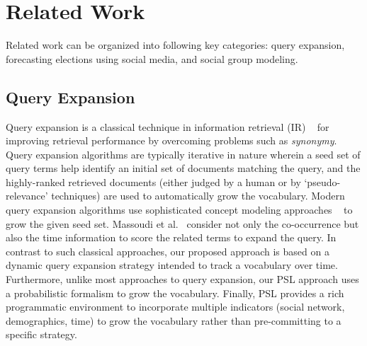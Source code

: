 \section{Related Work}
Related work can be organized into following key categories: query expansion, forecasting elections using social media,
and social group modeling.
\begin{comment}
\reviews{refer\\
Dongsheng Duan, Yuhua Li, Ruixuan Li, Rui Zhang, and Aiming Wen. 2012. RankTopic: Ranking Based Topic Modeling. In Proceedings of the 2012 IEEE 12th International Conference on Data Mining (ICDM 12) [This work also captures relational information] ; Daniel Ramage, Susan T. Dumais, and Daniel J. Liebling. ICWSM, The AAAI Press, (2010); Castella, Quim and Sutton, Charles A Word Storms: Multiples of Word Clouds for Visual Comparison of Documents. CoRR abs/1301.0503 (2013)\\
Lau, Jey Han, Nigel Collier and Timothy Baldwin (2012) On-line Trend Analysis with Topic Models: hashtag twitter trends detection topic model online, In Proceedings of the 24th International Conference on Computational Linguistics (COLING 2012)
}
\end{comment}

\subsection{Query Expansion}
Query expansion is a classical technique in information retrieval (IR) ~\cite{manning2008introduction} for improving
retrieval performance by overcoming problems such as {\it synonymy}. Query expansion algorithms
are typically iterative in nature wherein a seed set of query terms help identify an initial set
of documents matching the query, and the highly-ranked retrieved documents (either judged by a human
or by `pseudo-relevance' techniques) are used to automatically grow the vocabulary. Modern
query expansion algorithms use sophisticated concept modeling approaches ~\cite{metzler2007latent}
to grow the given seed set. Massoudi et al.~\cite{massoudi2011incorporating} consider not only the co-occurrence but also the time information to score the related terms to expand the query.  
In contrast to such classical approaches,
our proposed approach is based on a dynamic query expansion strategy  intended to track a vocabulary
over time. Furthermore, unlike most approaches to query expansion, our PSL approach uses a probabilistic formalism
to grow the vocabulary. Finally, PSL provides a rich programmatic environment to incorporate 
multiple indicators (social network, demographics, time) to grow the vocabulary rather than pre-committing to a 
specific strategy.

